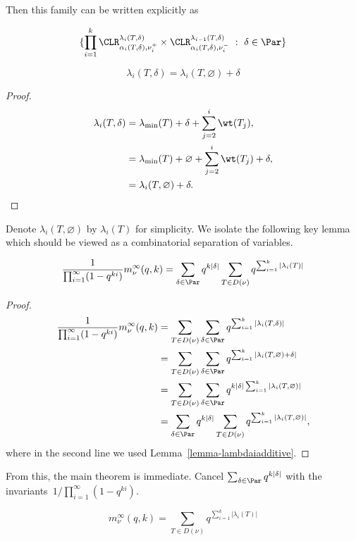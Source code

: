 Then this family can be written explicitly as 

$$ \{\prod_{i=1}^k \CLR^{\lambda_i(T, \delta)}_{\alpha_i(T, \delta), \nu_i^+} \times \CLR^{\lambda_{i-1}(T,\delta)}_{\alpha_i(T,\delta), \nu_i^-} \ : \  \delta \in \Par \} $$

\begin{lemma} \label{lemma-lambdaiadditive}
    $$\lambda_i(T, \delta) = \lambda_i(T, \varnothing) + \delta$$
\end{lemma}
\begin{proof}
    \begin{align*}
    \lambda_i(T, \delta) &= \lambda_{\min}(T) + \delta + \sum_{j=2}^{i} \wt(T_j),\\
    &= \lambda_{\min}(T) + \varnothing + \sum_{j=2}^{i} \wt(T_j) + \delta,\\
    &= \lambda_i(T, \varnothing) + \delta.
    \end{align*}
\end{proof}

Denote $\lambda_i(T, \varnothing)$ by $\lambda_i(T)$ for simplicity. We isolate the following key lemma which should be viewed as a combinatorial separation of variables. 

\begin{lemma}
    $$\frac{1}{\prod_{i=1}^\infty(1-q^{ki})} m_\nu^\infty(q,k) = \sum_{\delta \in \Par} q^{k|\delta|} \sum_{T \in D(\nu)} q^{\sum_{i=1}^k |\lambda_i(T)|}$$
\end{lemma}

\begin{proof}

    \begin{align*}
    \frac{1}{\prod_{i=1}^\infty(1-q^{ki})}m_\nu^\infty(q,k) &= \sum_{T \in D(\nu)} \sum_{\delta \in \Par} q^{\sum_{i=1}^k |\lambda_i(T, \delta)|}\\
    &= \sum_{T \in D(\nu)} \sum_{\delta \in \Par} q^{\sum_{i=1}^k |\lambda_i(T, \varnothing) + \delta|}\\
    &= \sum_{T \in D(\nu)} \sum_{\delta \in \Par} q^{k|\delta|\sum_{i=1}^k |\lambda_i(T, \varnothing)|}\\
    &= \sum_{\delta \in \Par} q^{k|\delta|} \sum_{T \in D(\nu)} q^{\sum_{i=1}^k |\lambda_i(T, \varnothing)|},
    \end{align*}
    where in the second line we used Lemma~\ref{lemma-lambdaiadditive}.
\end{proof}

From this, the main theorem is immediate. Cancel $\sum_{\delta \in \Par} q^{k|\delta|}$ with the invariants~$1/\prod_{i=1}^\infty(1-q^{ki})$.

\begin{thm}\label{thm:main}
     $$m_\nu^\infty(q,k) = \sum_{T \in D(\nu)} q^{\sum_{i=1}^k |\lambda_i(T)|}$$
\end{thm}

